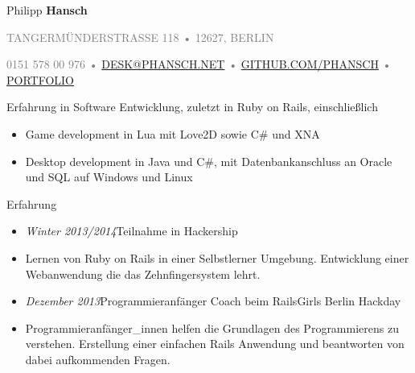 \documentclass[12pt]{article}
\begin{document}
\thispagestyle{empty}



{\Huge Philipp \textbf{Hansch}}

{\footnotesize
  \textcolor{Gray}{
    \uppercase{Tangermünderstrasse 118}
    •
    \uppercase{12627, Berlin}
  }

  \textcolor{Gray}{
    0151 578 00 976
	•
    \uppercase{\href{mailto:desk@phansch.net}{desk@phansch.net} }
    •
    \uppercase{\href{http://github.com/phansch}{github.com/phansch}}
    •
    \uppercase{\href{http://portfolio.phansch.net/\#folio-mid}{Portfolio}}
  }
}

\vspace{0.5cm}

Erfahrung in Software Entwicklung, zuletzt in Ruby on Rails, einschließlich

\begin{itemize}
  \setlength{\itemsep}{0.1cm}
  \setlength{\parskip}{0.1cm}
  \item Game development in Lua mit Love2D sowie C\# und XNA
  \item Desktop development in Java und C\#, mit Datenbankanschluss an Oracle und SQL auf Windows und Linux
\end{itemize}
\vspace{0.5cm}

{\Large Erfahrung}
\begin{itemize}
  \setlength{\itemsep}{0cm}
  \setlength{\parskip}{0cm}

  \item[] \emph{Winter 2013/2014}\hfill Teilnahme in Hackership
  \item[] Lernen von Ruby on Rails in einer Selbstlerner Umgebung. Entwicklung einer Webanwendung die das Zehnfingersystem lehrt.
\end{itemize}

\begin{itemize}
  \setlength{\itemsep}{0cm}
  \setlength{\parskip}{0cm}

  \item[] \emph{Dezember 2013}\hfill Programmieranfänger Coach beim RailsGirls Berlin Hackday
  \item[] Programmieranfänger\_innen helfen die Grundlagen des Programmierens zu verstehen. Erstellung einer einfachen Rails Anwendung und beantworten von dabei aufkommenden Fragen.
\end{itemize}
\end{document}

